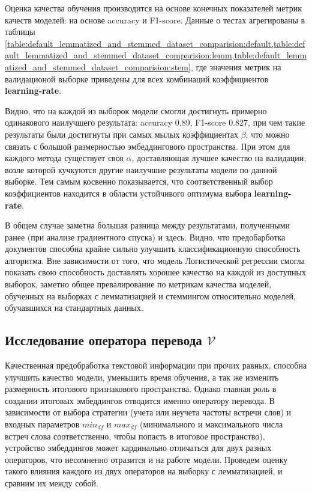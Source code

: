 \documentclass{article}
\begin{document}
            Оценка качества обучения производится на основе конечных показателей метрик качеств моделей: на основе accuracy и F1-score. Данные о тестах агрегированы в таблицы \cref{table:default_lemmatized_and_stemmed_dataset_comparision:default,table:default_lemmatized_and_stemmed_dataset_comparision:lemm,table:default_lemmatized_and_stemmed_dataset_comparision:stem}, где значения метрик на валидационой выборке приведены для всех комбинаций коэффициентов \textbf{learning-rate}. 

            Видно, что на каждой из выборок модели смогли достигнуть примерно одинакового наилучшего результата: accuracy 0.89, F1-score 0.827, при чем такие результаты были достигнуты при самых мылых коэффициентах $\beta$, что можно связать с большой размерностью эмбеддингового пространства. При этом для каждого метода существует своя $\alpha$, доставляющая лучшее качество на валидации, возле которой кучкуются другие наилучшие результаты модели по данной выборке. Тем самым косвенно показывается, что соответственный выбор коэффициентов находится в области устойчивого оптимума выбора \textbf{learning-rate}.

            В общем случае заметна большая разница между результатами, полученными ранее (при анализе градиентного спуска) и здесь. Видно, что предобарботка документов способна крайне сильно улучшить классификационную способность алгоритма. Вне зависимости от того, что модель Логистической регрессии смогла показать свою способность доставлять хорошее качество на каждой из доступных выборок, заметно общее превалирование по метрикам качества моделей, обученных на выборках с лемматизацией и стеммингом относительно моделей, обучавшихся на стандартных данных.
            
            
    \subsection{Исследование оператора перевода $\mathcal{V}$}

        Качественная предобработка текстовой информации при прочих равных, способна улучшить качество модели, уменьшить время обучения, а так же изменить размерность итогового признакового пространства. Однако главная роль в создании итоговых эмбеддингов отводится именно оператору перевода. В зависимости от выбора стратегии (учета или неучета частоты встречи слов) и входных параметров ${min}_{df}$ и ${max}_{df}$ (минимального и максимального числа встреч слова соответственно, чтобы попасть в итоговое пространство), устройство эмбеддингов может кардинально отличаться для двух разных операторов, что несомненно отразится и на работе модели. Проведем оценку такого влияния каждого из двух операторов на выборку с лемматизацией, и сравним их между собой.
\end{document}
